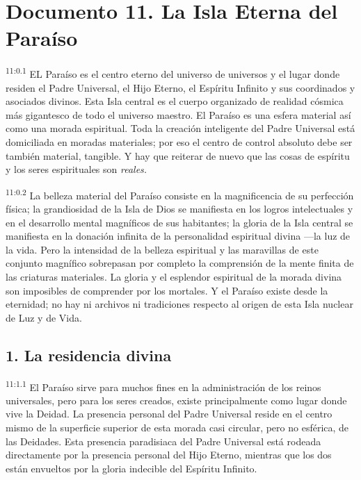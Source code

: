 \chapter{Documento 11. La Isla Eterna del Paraíso}
\par
\textsuperscript{11:0.1} EL Paraíso es el centro eterno del universo de universos y el lugar donde residen el Padre Universal, el Hijo Eterno, el Espíritu Infinito y sus coordinados y asociados divinos. Esta Isla central es el cuerpo organizado de realidad cósmica más gigantesco de todo el universo maestro. El Paraíso es una esfera material así como una morada espiritual. Toda la creación inteligente del Padre Universal está domiciliada en moradas materiales; por eso el centro de control absoluto debe ser también material, tangible. Y hay que reiterar de nuevo que las cosas de espíritu y los seres espirituales son \textit{reales.}

\par
\textsuperscript{11:0.2} La belleza material del Paraíso consiste en la magnificencia de su perfección física; la grandiosidad de la Isla de Dios se manifiesta en los logros intelectuales y en el desarrollo mental magníficos de sus habitantes; la gloria de la Isla central se manifiesta en la donación infinita de la personalidad espiritual divina ---la luz de la vida. Pero la intensidad de la belleza espiritual y las maravillas de este conjunto magnífico sobrepasan por completo la comprensión de la mente finita de las criaturas materiales. La gloria y el esplendor espiritual de la morada divina son imposibles de comprender por los mortales. Y el Paraíso existe desde la eternidad; no hay ni archivos ni tradiciones respecto al origen de esta Isla nuclear de Luz y de Vida.

\section*{1. La residencia divina}
\par
\textsuperscript{11:1.1} El Paraíso sirve para muchos fines en la administración de los reinos universales, pero para los seres creados, existe principalmente como lugar donde vive la Deidad. La presencia personal del Padre Universal reside en el centro mismo de la superficie superior de esta morada casi circular, pero no esférica, de las Deidades. Esta presencia paradisiaca del Padre Universal está rodeada directamente por la presencia personal del Hijo Eterno, mientras que los dos están envueltos por la gloria indecible del Espíritu Infinito.

